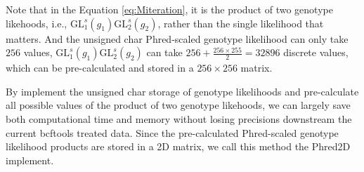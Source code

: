 \documentclass{article}
\begin{document}
Note that in the Equation \ref{eq:Miteration}, it is the product of two genotype likehoods, i.e., $\mathrm{GL}_1^s(g_1)\mathrm{GL}_2^s(g_2)$, rather than the single likelihood that matters. And the unsigned char Phred-scaled genotype likelihood can only take $256$ values, $\mathrm{GL}_1^s(g_1)\mathrm{GL}_2^s(g_2)$ can take $256+\frac{256\times 255}{2}=32896$ discrete values, which can be pre-calculated and stored in a $256\times 256$ matrix.

By implement the unsigned char storage of genotype likelihoods and pre-calculate all possible values of the product of two genotype likehoods, we can largely save both computational time and memory without losing precisions downstream the current bcftools treated data. Since the pre-calculated Phred-scaled genotype likelihood products are stored in a 2D matrix, we call this method the Phred2D implement.
\end{document}
